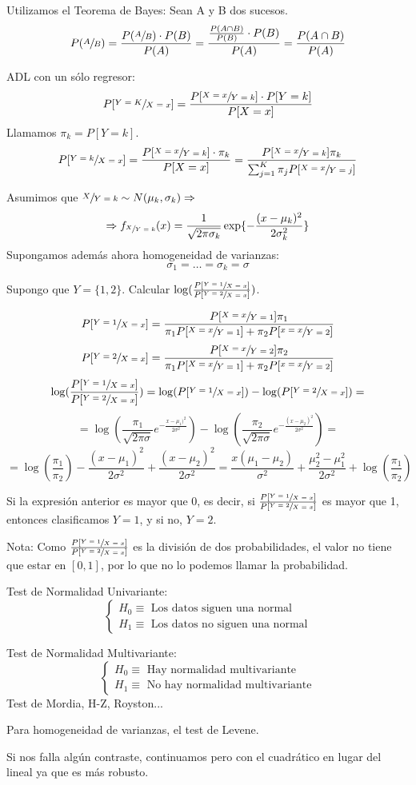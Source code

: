 \documentclass[11pt,a4paper]{article}
\begin{document}
Utilizamos el Teorema de Bayes: Sean A y B dos sucesos.
$$P(\sfrac{A}{B}) = \frac{P(\sfrac{A}{B}) \cdot P(B)}{P(A)} = \frac{\frac{P(A \cap B)}{P(B)} \cdot P(B)}{P(A)} = \frac{P(A \cap B)}{P(A)}$$

ADL con un sólo regresor:
$$P[\sfrac{Y=K}{X=x}] = \frac{P[\sfrac{X=x}{Y=k}] \cdot P[Y=k]}{P[X=x]}$$
Llamamos $\pi_{k} = P[Y=k]$.
$$P[\sfrac{Y=k}{X=x}] = \frac{P[\sfrac{X=x}{Y=k}] \cdot \pi_{k}}{P[X=x]} = \frac{P[\sfrac{X=x}{Y=k}]\pi_{k}}{\sum_{j=1}^{K} \pi_{j} P[\sfrac{X=x}{Y=j}]}$$

Asumimos que $\sfrac{X}{Y=k} \sim N(\mu_{k}, \sigma_{k}) \Rightarrow$
$$\Rightarrow f_{\sfrac{X}{Y=k}}(x) = \frac{1}{\sqrt{2\pi\sigma_{k}}} \exp\{-\frac{(x-\mu_{k})^{2}}{2\sigma_{k}^{2}}\}$$
Supongamos además ahora homogeneidad de varianzas:
$$\sigma_{1} = \dots = \sigma_{k} = \sigma$$

Supongo que $Y = \{1, 2\}$. Calcular $\log(\frac{P[\sfrac{Y=1}{X=x}]}{P[\sfrac{Y=2}{X=x}]})$.

$$P[\sfrac{Y=1}{X=x}] = \frac{P[\sfrac{X=x}{Y=1}]\pi_{1}}{\pi_{1}P[\sfrac{X=x}{Y=1}] + \pi_{2}P[\sfrac{x=x}{Y=2}]}$$
$$P[\sfrac{Y=2}{X=x}] = \frac{P[\sfrac{X=x}{Y=2}]\pi_{2}}{\pi_{1}P[\sfrac{X=x}{Y=1}] + \pi_{2}P[\sfrac{x=x}{Y=2}]}$$
$$\log(\frac{P[\sfrac{Y=1}{X=x}]}{P[\sfrac{Y=2}{X=x}]}) = \log(P[\sfrac{Y=1}{X=x}]) - \log(P[\sfrac{Y=2}{X=x}]) =$$
$$= \log(\frac{\pi_{1}}{\sqrt{2\pi\sigma}} e^{-\frac{x-\mu_{1})^{2}}{2\sigma^{2}}}) - \log(\frac{\pi_{2}}{\sqrt{2\pi\sigma}}e^{-\frac{(x-\mu_{2})^{2}}{2\sigma^{2}}}) =$$
$$= \log(\frac{\pi_{1}}{\pi_{2}}) - \frac{(x-\mu_{1})^{2}}{2\sigma^{2}} + \frac{(x-\mu_{2})^{2}}{2\sigma^{2}} = \frac{x(\mu_{1}-\mu_{2})}{\sigma^{2}} + \frac{\mu_{2}^{2}-\mu_{1}^{2}}{2\sigma^{2}} + \log(\frac{\pi_{1}}{\pi_{2}})$$

Si la expresión anterior es mayor que 0, es decir, si $\frac{P[\sfrac{Y=1}{X=x}]}{P[\sfrac{Y=2}{X=x}]}$ es mayor que 1, entonces clasificamos $Y=1$, y si no, $Y=2$.

Nota: Como $\frac{P[\sfrac{Y=1}{X=x}]}{P[\sfrac{Y=2}{X=x}]}$ es la división de dos probabilidades, el valor no tiene que estar en $[0,1]$, por lo que no lo podemos llamar la probabilidad.

Test de Normalidad Univariante:
$$\begin{cases}
H_{0} \equiv \text{ Los datos siguen una normal} \\
H_{1} \equiv \text{ Los datos no siguen una normal}
\end{cases}$$

Test de Normalidad Multivariante:
$$\begin{cases}
H_{0} \equiv \text{ Hay normalidad multivariante} \\
H_{1} \equiv \text{ No hay normalidad multivariante}
\end{cases}$$
Test de Mordia, H-Z, Royston...

Para homogeneidad de varianzas, el test de Levene.

Si nos falla algún contraste, continuamos pero con el cuadrático en lugar del lineal ya que es más robusto.
\end{document}
